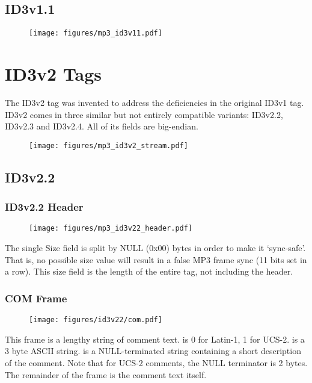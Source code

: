 \subsection{ID3v1.1}

\begin{figure}[h]
\texttt{[image: figures/mp3\_id3v11.pdf]}
\end{figure}

\section{ID3v2 Tags}

The ID3v2 tag was invented to address the deficiencies in the original
ID3v1 tag.
ID3v2 comes in three similar but not entirely compatible variants:
ID3v2.2, ID3v2.3 and ID3v2.4.
All of its fields are big-endian.

\begin{figure}[h]
\texttt{[image: figures/mp3\_id3v2\_stream.pdf]}
\end{figure}

\subsection{ID3v2.2}

\subsubsection{ID3v2.2 Header}

\begin{figure}[h]
\texttt{[image: figures/mp3\_id3v22\_header.pdf]}
\end{figure}
\par
\noindent
The single Size field is split by NULL (0x00) bytes in order to make
it `sync-safe'.
That is, no possible size value will result in a false
MP3 frame sync (11 bits set in a row).
This size field is the length of the entire tag, not including the header.

\subsubsection{COM Frame}
\begin{figure}[h]
\texttt{[image: figures/id3v22/com.pdf]}
\end{figure}
This frame is a lengthy string of comment text.
 is 0 for Latin-1, 1 for UCS-2.
 is a 3 byte ASCII string.
 is a NULL-terminated string
containing a short description of the comment.
Note that for UCS-2 comments, the NULL terminator is 2 bytes.
The remainder of the frame is the comment text itself.

